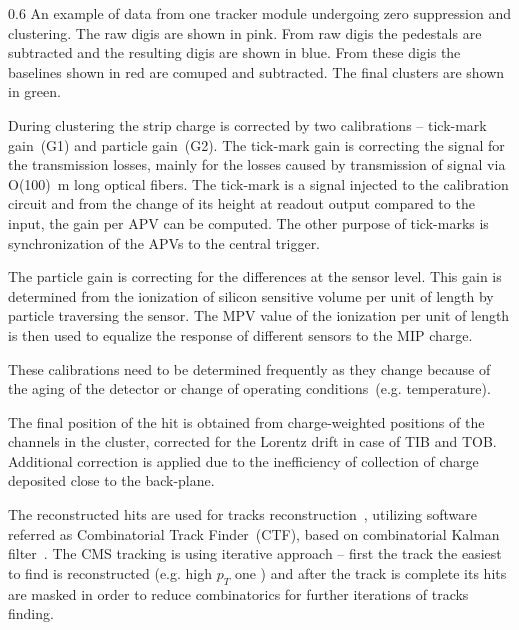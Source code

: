                  {0.6}       %
                 {An example of data from one tracker module undergoing zero suppression and clustering. The raw digis are shown in pink. From raw digis the pedestals are subtracted and the resulting digis are shown in blue. From these digis the baselines shown in red are comuped and subtracted. The final clusters are shown in green.} %

During clustering the strip charge is corrected by two calibrations -- tick-mark gain~(G1) and particle gain~(G2). The tick-mark gain is correcting the signal for the transmission losses, mainly for the losses caused by transmission of signal via O(100)~m long optical fibers. The tick-mark is a signal injected to the calibration circuit and from the change of its height at readout output compared to the input, the gain per APV can be computed. The other purpose of tick-marks is synchronization of the APVs to the central trigger.

The particle gain is correcting for the differences at the sensor level. This gain is determined from the ionization of silicon sensitive volume per unit of length by particle traversing the sensor. The MPV value of the ionization per unit of length is then used to equalize the response of different sensors to the MIP charge. 

These calibrations need to be determined frequently as they change because of the aging of the detector or change of operating conditions~(e.g. temperature).

The final position of the hit is obtained from charge-weighted positions of the channels in the cluster, corrected for the Lorentz drift in case of TIB and TOB. Additional correction is applied due to the inefficiency of collection of charge deposited close to the back-plane. 

The reconstructed hits are used for tracks reconstruction~\cite{Chatrchyan:2014fea}, utilizing software referred as Combinatorial Track Finder~(CTF), based on combinatorial Kalman filter~\cite{Fruhwirth:1987fm}. The CMS tracking is using iterative approach -- first the track the easiest to find is reconstructed (e.g. high $p_{T}$ one ) and after the track is complete its hits are masked in order to reduce combinatorics for further iterations of tracks finding.


